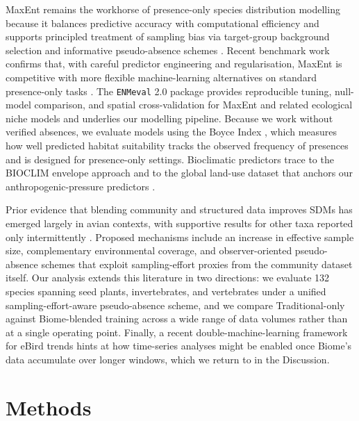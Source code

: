 \documentclass[11pt]{article}
\begin{document}
MaxEnt remains the workhorse of presence-only species distribution modelling because it balances predictive accuracy with computational efficiency and supports principled treatment of sampling bias via target-group background selection and informative pseudo-absence schemes \citep{phillips2006maxent,phillips2008maxentextensions,phillips2009samplebias,elith2011statistical}. Recent benchmark work confirms that, with careful predictor engineering and regularisation, MaxEnt is competitive with more flexible machine-learning alternatives on standard presence-only tasks \citep{valavi2022predictive}. The \texttt{ENMeval} 2.0 package \citep{kass2021enmeval} provides reproducible tuning, null-model comparison, and spatial cross-validation for MaxEnt and related ecological niche models and underlies our modelling pipeline. Because we work without verified absences, we evaluate models using the Boyce Index \citep{hirzel2006boyce}, which measures how well predicted habitat suitability tracks the observed frequency of presences and is designed for presence-only settings. Bioclimatic predictors trace to the BIOCLIM envelope approach \citep{booth2014bioclim} and to the global land-use dataset that anchors our anthropogenic-pressure predictors \citep{newbold2015land}.

Prior evidence that blending community and structured data improves SDMs has emerged largely in avian contexts, with supportive results for other taxa reported only intermittently \citep{johnston2018estimates,johnston2021analytical,robinson2020integrating,steen2019stringent,milanesi2020observer,feldman2021trends}. Proposed mechanisms include an increase in effective sample size, complementary environmental coverage, and observer-oriented pseudo-absence schemes that exploit sampling-effort proxies from the community dataset itself. Our analysis extends this literature in two directions: we evaluate 132 species spanning seed plants, invertebrates, and vertebrates under a unified sampling-effort-aware pseudo-absence scheme, and we compare Traditional-only against Biome-blended training across a wide range of data volumes rather than at a single operating point. Finally, a recent double-machine-learning framework for eBird trends \citep{fink2023double} hints at how time-series analyses might be enabled once Biome's data accumulate over longer windows, which we return to in the Discussion.

\section{Methods}
\end{document}
